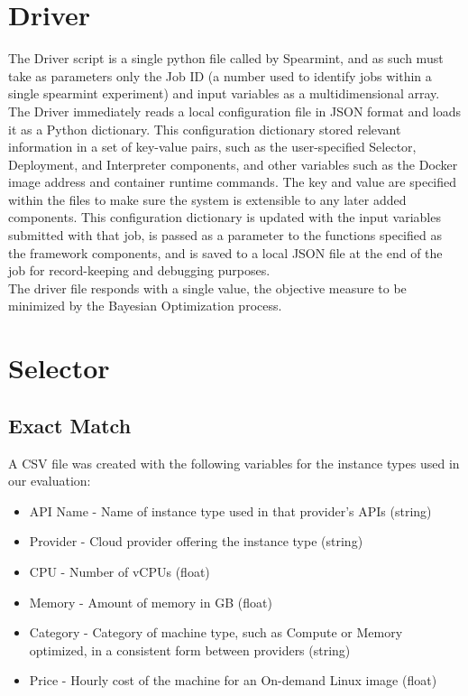 \documentclass{report}
\begin{document}
\section{Driver}
The Driver script is a single python file called by Spearmint, and as such must take as parameters only the Job ID (a number used to identify jobs within a single spearmint experiment) and input variables as a multidimensional array.\\
The Driver immediately reads a local configuration file in JSON format and loads it as a Python dictionary. This configuration dictionary stored relevant information in a set of key-value pairs, such as the user-specified Selector, Deployment, and Interpreter components, and other variables such as the Docker image address and container runtime commands. The key and value are specified within the files to make sure the system is extensible to any later added components. This configuration dictionary is updated with the input variables submitted with that job, is passed as a parameter to the functions specified as the framework components, and is saved to a local JSON file at the end of the job for record-keeping and debugging purposes. \\
The driver file responds with a single value, the objective measure to be minimized by the Bayesian Optimization process.
\section{Selector}
\subsection{Exact Match}
A CSV file was created with the following variables for the instance types used in our evaluation:

\begin{itemize}
\item API Name - Name of instance type used in that provider's APIs (string)
\item Provider - Cloud provider offering the instance type (string)
\item CPU - Number of vCPUs (float)
\item Memory - Amount of memory in GB (float)
\item Category - Category of machine type, such as Compute or Memory optimized, in a consistent form between providers (string) 	
\item Price - Hourly cost of the machine for an On-demand Linux image (float)
\end{itemize}
\end{document}
